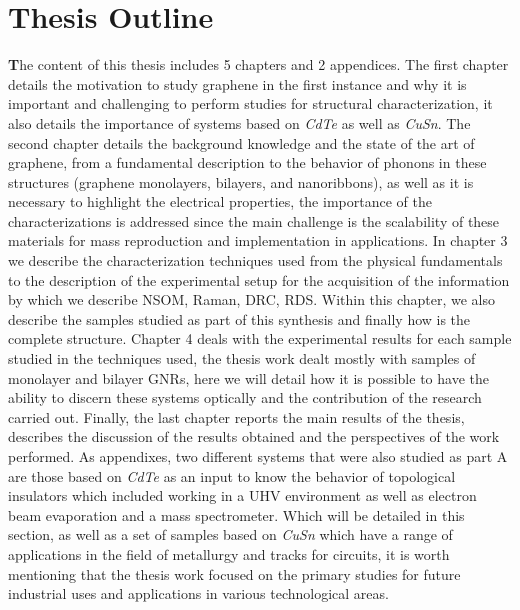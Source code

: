 \section{Thesis Outline}
\vspace{-1cm}
\lettrine[lines=3, lraise=0.1, nindent=0mm, slope=0mm]{\textbf{T}}{}he content of this thesis includes 5 chapters and 2 appendices. The first chapter details the motivation to study graphene in the first instance and why it is important and challenging to perform studies for structural characterization, it also details the importance of systems based on \textit{CdTe} as well as \textit{CuSn}. The second chapter details the background knowledge and the state of the art of graphene, from a fundamental description to the behavior of phonons in these structures (graphene monolayers, bilayers, and nanoribbons), as well as it is necessary to highlight the electrical properties, the importance of the characterizations is addressed since the main challenge is the scalability of these materials for mass reproduction and implementation in applications.  In chapter 3 we describe the characterization techniques used from the physical fundamentals to the description of the experimental setup for the acquisition of the information by which we describe NSOM, Raman, DRC, RDS. Within this chapter, we also describe the samples studied as part of this synthesis and finally how is the complete structure. Chapter 4 deals with the experimental results for each sample studied in the techniques used, the thesis work dealt mostly with samples of monolayer and bilayer GNRs, here we will detail how it is possible to have the ability to discern these systems optically and the contribution of the research carried out. Finally, the last chapter reports the main results of the thesis,  describes the discussion of the results obtained and the perspectives of the work performed. As appendixes, two different systems that were also studied as part A are those based on \textit{CdTe }as an input to know the behavior of topological insulators which included working in a UHV environment as well as electron beam evaporation and a mass spectrometer. Which will be detailed in this section, as well as a set of samples based on \textit{CuSn} which have a range of applications in the field of metallurgy and tracks for circuits, it is worth mentioning that the thesis work focused on the primary studies for future industrial uses and applications in various technological areas. 
